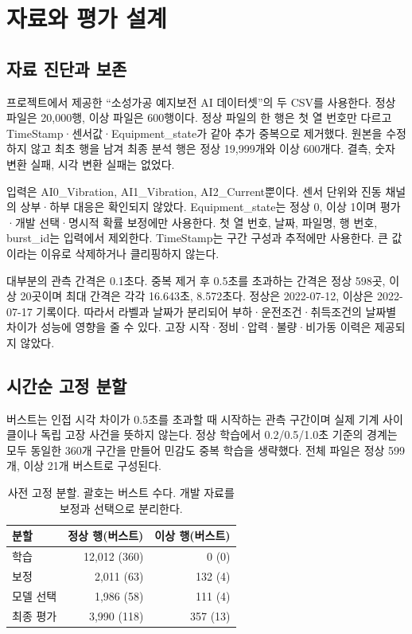 \documentclass{article}
\begin{document}
\section{자료와 평가 설계}
\subsection{자료 진단과 보존}
프로젝트에서 제공한 ``소성가공 예지보전 AI 데이터셋''의 두 CSV를 사용한다. 정상 파일은 20,000행, 이상 파일은 600행이다. 정상 파일의 한 행은 첫 열 번호만 다르고 TimeStamp·센서값·Equipment\_state가 같아 추가 중복으로 제거했다. 원본을 수정하지 않고 최초 행을 남겨 최종 분석 행은 정상 19,999개와 이상 600개다. 결측, 숫자 변환 실패, 시각 변환 실패는 없었다.

입력은 AI0\_Vibration, AI1\_Vibration, AI2\_Current뿐이다. 센서 단위와 진동 채널의 상부·하부 대응은 확인되지 않았다. Equipment\_state는 정상 0, 이상 1이며 평가·개발 선택·명시적 확률 보정에만 사용한다. 첫 열 번호, 날짜, 파일명, 행 번호, burst\_id는 입력에서 제외한다. TimeStamp는 구간 구성과 추적에만 사용한다. 큰 값이라는 이유로 삭제하거나 클리핑하지 않는다.

대부분의 관측 간격은 0.1초다. 중복 제거 후 0.5초를 초과하는 간격은 정상 598곳, 이상 20곳이며 최대 간격은 각각 16.643초, 8.572초다. 정상은 2022-07-12, 이상은 2022-07-17 기록이다. 따라서 라벨과 날짜가 분리되어 부하·운전조건·취득조건의 날짜별 차이가 성능에 영향을 줄 수 있다. 고장 시작·정비·압력·불량·비가동 이력은 제공되지 않았다.

\subsection{시간순 고정 분할}
버스트는 인접 시각 차이가 0.5초를 초과할 때 시작하는 관측 구간이며 실제 기계 사이클이나 독립 고장 사건을 뜻하지 않는다. 정상 학습에서 0.2/0.5/1.0초 기준의 경계는 모두 동일한 360개 구간을 만들어 민감도 중복 학습을 생략했다. 전체 파일은 정상 599개, 이상 21개 버스트로 구성된다.

\begin{table}[t]
\caption{사전 고정 분할. 괄호는 버스트 수다. 개발 자료를 보정과 선택으로 분리한다.}
\label{tab:split}
\centering\small
\begin{tabular}{lrr}\toprule
분할 & 정상 행(버스트) & 이상 행(버스트)\\\midrule
학습 & 12,012 (360) & 0 (0)\\
보정 & 2,011 (63) & 132 (4)\\
모델 선택 & 1,986 (58) & 111 (4)\\
최종 평가 & 3,990 (118) & 357 (13)\\\bottomrule
\end{tabular}
\end{table}
\end{document}
